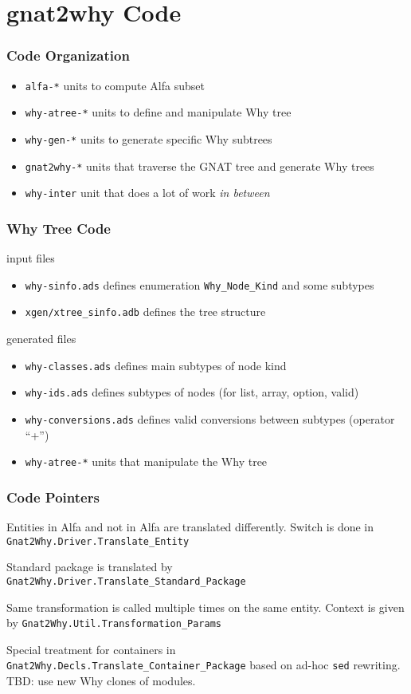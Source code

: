 \documentclass{beamer}
\newcommand{\vs}{\vspace{0.5cm}}
\newenvironment{specialframe}{%
  \begin{frame}[fragile,environment=specialframe]}{\end{frame}}
\begin{document}
\section{gnat2why Code}

\begin{specialframe}\frametitle{Code Organization}
   \begin{itemize}
      \item \verb|alfa-*|       units to compute Alfa subset
      \item \verb|why-atree-*|  units to define and manipulate Why tree
      \item \verb|why-gen-*|    units to generate specific Why subtrees
      \item \verb|gnat2why-*|   units that traverse the GNAT tree and generate
         Why trees
      \item \verb|why-inter|    unit that does a lot of work \emph{in between}
   \end{itemize}
\end{specialframe}

\begin{specialframe}\frametitle{Why Tree Code}
  input files
  \begin{itemize}
  \item \verb|why-sinfo.ads|  defines enumeration \verb|Why_Node_Kind| and some subtypes
  \item \verb|xgen/xtree_sinfo.adb| defines the tree structure
  \end{itemize}

\vs
  generated files
  \begin{itemize}
  \item \verb|why-classes.ads| defines main subtypes of node kind
  \item \verb|why-ids.ads|    defines subtypes of nodes (for list, array, option, valid)
  \item \verb|why-conversions.ads|    defines valid conversions between subtypes (operator ``+'')
  \item \verb|why-atree-*|   units that manipulate the Why tree
   \end{itemize}
\end{specialframe}

\begin{specialframe}\frametitle{Code Pointers}

  Entities in Alfa and not in Alfa are translated differently. Switch is done
  in \verb|Gnat2Why.Driver.Translate_Entity|

\vs

Standard package is translated by
\verb|Gnat2Why.Driver.Translate_Standard_Package|

\vs

  Same transformation is called multiple times on the same entity. Context is
  given by \verb|Gnat2Why.Util.Transformation_Params|

\vs

Special treatment for containers in
\verb|Gnat2Why.Decls.Translate_Container_Package| based on ad-hoc \verb|sed|
rewriting. TBD: use new Why clones of modules.

\end{specialframe}
\end{document}
